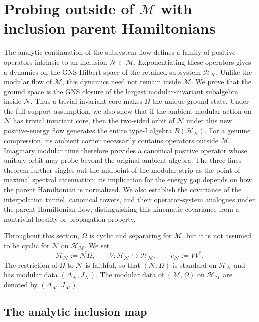 \documentclass[a4paper,11pt]{article}
\theoremstyle{definition}
\newcommand{\mN}{\mathcal{N}}
\newcommand{\mH}{\mathcal{H}}
\newcommand{\mM}{\mathcal{M}}
\begin{document}
\section{Probing outside of $\mM$ with inclusion parent Hamiltonians}
\label{sec:probing-outside-M}

The analytic continuation of the subsystem flow defines a family of positive
operators intrinsic to an inclusion $\mN\subset \mM$. Exponentiating these operators gives a dynamics on the GNS
Hilbert space of the retained subsystem $\mH_{\mN}$. Unlike the modular flow of
$\mM$, this dynamics need not remain inside $\mM$. We prove that the ground space is the GNS closure of the
largest modular-invariant subalgebra inside $\mN$. Thus a trivial invariant
core makes $\Omega$ the unique ground state. Under the full-support
assumption, we also show
that if the ambient modular action on $\mN$ has trivial invariant core, then
the two-sided orbit of $\mN$ under this new positive-energy flow
generates the entire type-I algebra $B(\mH_{\mN})$. For a genuine compression,
its ambient corner necessarily contains operators outside $\mM$. Imaginary modular time therefore provides a canonical positive operator whose unitary orbit may probe beyond the original ambient algebra.
The three-lines theorem further singles out the midpoint of the modular strip
as the point of maximal spectral attenuation; its implication for the energy
gap depends on how the parent Hamiltonian is normalized. We also establish
the covariance of the interpolation tunnel, canonical towers, and their
operator-system analogues under the parent-Hamiltonian flow, distinguishing
this kinematic covariance from a nontrivial locality or propagation property.

Throughout this section, $\Omega$ is cyclic and separating for
$\mM$, but it is not assumed to be cyclic for $\mN$ on
$\mH_{\mM}$. We set
\begin{equation}
    \mH_{\mN}
    :=
    \overline{\mN\Omega},
    \qquad
    V:\mH_{\mN}\hookrightarrow\mH_{\mM},
    \qquad
    e_{\mN}:=VV^* .
    \label{eq:probing-HN}
\end{equation}
The restriction of $\Omega$ to $\mN$ is faithful, so that
$(\mN,\Omega)$ is standard on $\mH_{\mN}$ and has modular data
$(\Delta_{\mN},J_{\mN})$. The modular data of $(\mM,\Omega)$ on
$\mH_{\mM}$ are denoted by $(\Delta_{\mM},J_{\mM})$.

\subsection{The analytic inclusion map}
\end{document}
